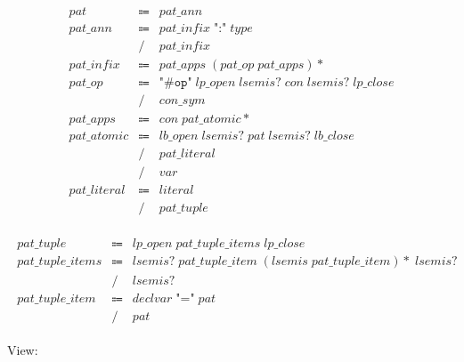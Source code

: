 \begin{align*}
    \begin{array}{rcll}
        \mathit{pat}
        &\Coloneq &\mathit{pat\_ann} \\
        \mathit{pat\_ann}
        &\Coloneq &\mathit{pat\_infix}\; \texttt{":"}\; \mathit{type} \\
        &\mathrel{/} &\mathit{pat\_infix} \\
        \mathit{pat\_infix}
        &\Coloneq &\mathit{pat\_apps}\; (\mathit{pat\_op}\; \mathit{pat\_apps}){*} \\
        \mathit{pat\_op}
        &\Coloneq &\texttt{"\#op"}\; \mathit{lp\_open}\; \mathit{lsemis}{?}\; \mathit{con}\; \mathit{lsemis}{?}\; \mathit{lp\_close} \\
        &\mathrel{/} &\mathit{con\_sym} \\
        \mathit{pat\_apps}
        &\Coloneq &\mathit{con}\; \mathit{pat\_atomic}{*} \\
        \mathit{pat\_atomic}
        &\Coloneq &\mathit{lb\_open}\; \mathit{lsemis}{?}\; \mathit{pat}\; \mathit{lsemis}{?}\; \mathit{lb\_close} \\
        &\mathrel{/} &\mathit{pat\_literal} \\
        &\mathrel{/} &\mathit{var} \\
        \mathit{pat\_literal}
        &\Coloneq &\mathit{literal} \\
        &\mathrel{/} &\mathit{pat\_tuple}
    \end{array}
\end{align*}

\begin{align*}
    \begin{array}{rcll}
        \mathit{pat\_tuple}
        &\Coloneq &\mathit{lp\_open}\; \mathit{pat\_tuple\_items}\; \mathit{lp\_close} \\
        \mathit{pat\_tuple\_items}
        &\Coloneq &\mathit{lsemis}{?}\; \mathit{pat\_tuple\_item}\; (\mathit{lsemis}\; \mathit{pat\_tuple\_item}){*}\; \mathit{lsemis}{?} \\
        &\mathrel{/} &\mathit{lsemis}{?} \\
        \mathit{pat\_tuple\_item}
        &\Coloneq &\mathit{declvar}\; \texttt{"="}\; \mathit{pat} \\
        &\mathrel{/} &\mathit{pat}
    \end{array}
\end{align*}

View:

